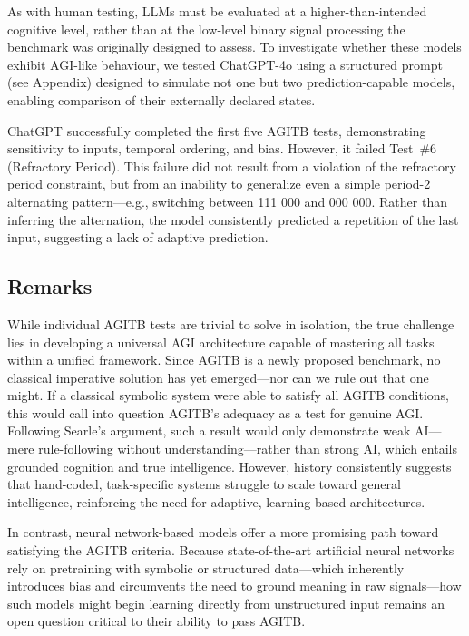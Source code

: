 \documentclass{article}
\begin{document}
As with human testing, LLMs must be evaluated at a higher-than-intended cognitive level, rather than at the low-level binary signal processing the benchmark was originally designed to assess. To investigate whether these models exhibit AGI-like behaviour, we tested ChatGPT-4o using a structured prompt (see Appendix) designed to simulate not one but two prediction-capable models, enabling comparison of their externally declared states.

ChatGPT successfully completed the first five AGITB tests, demonstrating sensitivity to inputs, temporal ordering, and bias. However, it failed Test~\#6 (Refractory Period). This failure did not result from a violation of the refractory period constraint, but from an inability to generalize even a simple period-2 alternating pattern—e.g., switching between 111 000 and 000 000. Rather than inferring the alternation, the model consistently predicted a repetition of the last input, suggesting a lack of adaptive prediction.


\subsection{Remarks}

While individual AGITB tests are trivial to solve in isolation, the true challenge lies in developing a universal AGI architecture capable of mastering all tasks within a unified framework. Since AGITB is a newly proposed benchmark, no classical imperative solution has yet emerged—nor can we rule out that one might. If a classical symbolic system were able to satisfy all AGITB conditions, this would call into question AGITB’s adequacy as a test for genuine AGI. Following Searle’s argument, such a result would only demonstrate weak AI—mere rule-following without understanding—rather than strong AI, which entails grounded cognition and true intelligence. However, history consistently suggests that hand-coded, task-specific systems struggle to scale toward general intelligence, reinforcing the need for adaptive, learning-based architectures.

In contrast, neural network-based models offer a more promising path toward satisfying the AGITB criteria. Because state-of-the-art artificial neural networks rely on pretraining with symbolic or structured data—which inherently introduces bias and circumvents the need to ground meaning in raw signals—how such models might begin learning directly from unstructured input remains an open question critical to their ability to pass AGITB.
\end{document}
